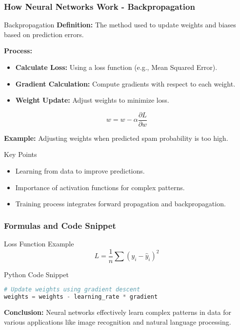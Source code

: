 \documentclass[aspectratio=169]{beamer}
\begin{document}
\begin{frame}[fragile]
    \frametitle{How Neural Networks Work - Backpropagation}
    \begin{block}{Backpropagation}
        \textbf{Definition:} The method used to update weights and biases based on prediction errors.

        \textbf{Process:}
        \begin{itemize}
            \item \textbf{Calculate Loss:} Using a loss function (e.g., Mean Squared Error).
            \item \textbf{Gradient Calculation:} Compute gradients with respect to each weight.
            \item \textbf{Weight Update:} Adjust weights to minimize loss.
        \end{itemize}
        \begin{equation}
            w = w - \alpha \frac{\partial L}{\partial w}
        \end{equation}
    \end{block}

    \textbf{Example:} Adjusting weights when predicted spam probability is too high.
    
    \begin{block}{Key Points}
        \begin{itemize}
            \item Learning from data to improve predictions.
            \item Importance of activation functions for complex patterns.
            \item Training process integrates forward propagation and backpropagation.
        \end{itemize}
    \end{block}
\end{frame}

\begin{frame}[fragile]
    \frametitle{Formulas and Code Snippet}
    \begin{block}{Loss Function Example}
        \begin{equation}
            L = \frac{1}{n} \sum (y_i - \hat{y}_i)^2
        \end{equation}
    \end{block}

    \begin{block}{Python Code Snippet}
    \begin{lstlisting}[language=Python]
# Update weights using gradient descent
weights = weights - learning_rate * gradient
    \end{lstlisting}
    \end{block}

    \textbf{Conclusion:} Neural networks effectively learn complex patterns in data for various applications like image recognition and natural language processing.
\end{frame}
\end{document}

